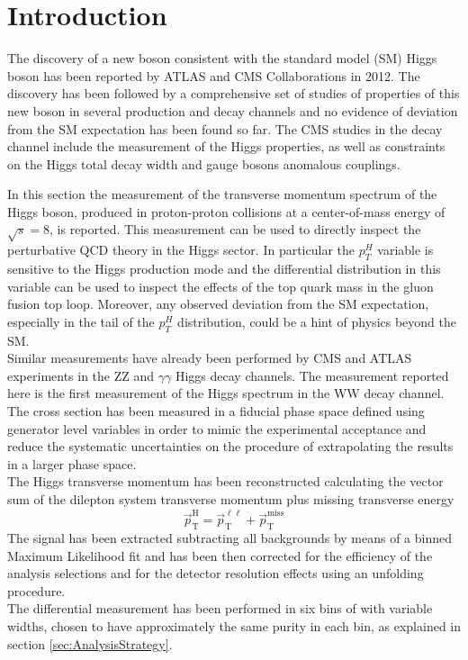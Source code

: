 \section{Introduction}
\label{sec:Introduction}
The discovery of a new boson consistent with the standard model (SM) Higgs boson has been reported by ATLAS and CMS Collaborations in 2012.
The discovery has been followed by a comprehensive set of studies of properties of this new boson in several production and decay channels and no evidence of deviation from the SM expectation has been found so far. The CMS studies in the \hwwllnn decay channel include the measurement of the Higgs properties, as well as constraints on the Higgs total decay width and gauge bosons anomalous couplings.

In this section the measurement of the transverse momentum spectrum of the Higgs boson, produced in proton-proton collisions at a center-of-mass energy of $\sqrt{s}=8$\TeV, is reported.
This measurement can be used to directly inspect the perturbative QCD theory in the Higgs sector.
In particular the $p_T^H$ variable is sensitive to the Higgs production mode and the differential distribution in this variable can be used to inspect the effects of the top quark mass in the gluon fusion top loop. Moreover, any observed deviation from the SM expectation, especially in the tail of the $p_T^H$ distribution, could be a hint of physics beyond the SM.\\
Similar measurements have already been performed by CMS and ATLAS experiments in the ZZ and $\gamma\gamma$ Higgs decay channels.
The measurement reported here is the first measurement of the Higgs \pt spectrum in the WW decay channel.\\
The cross section has been measured in a fiducial phase space defined using generator level variables in order to mimic the experimental acceptance and reduce the systematic uncertainties on the procedure of extrapolating the results in a larger phase space.\\
The Higgs transverse momentum has been reconstructed calculating the vector sum of the dilepton system transverse momentum plus missing transverse energy 
\begin{equation}
\vec{p}_\mathrm{T}^\mathrm{H} = \vec{p}_\mathrm{T}^{\ell\ell} + \vec{p}_\mathrm{T}^\mathrm{miss}
\end{equation}
The signal has been extracted subtracting all backgrounds by means of a binned Maximum Likelihood fit and has been then corrected for the efficiency of the analysis selections and for the detector resolution effects using an unfolding procedure.\\
The differential measurement has been performed in six bins of \pth with variable widths, chosen to have approximately the same purity in each bin, as explained in section \ref{sec:AnalysisStrategy}.\\



